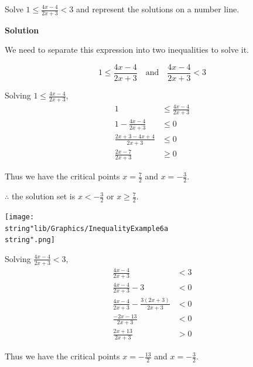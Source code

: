 \documentclass[11pt,a4paper]{book}
\begin{document}
\newpage

\begin{example}

Solve ${\displaystyle 1\leq\frac{4x-4}{2x+3}<3}$ and represent the
solutions on a number line.

\medskip

\textbf{Solution}

We need to separate this expression into two inequalities to solve
it.

\[
1\leq\frac{4x-4}{2x+3}\quad\text{and}\quad\frac{4x-4}{2x+3}<3
\]

Solving ${\displaystyle 1\leq\frac{4x-4}{2x+3}}$,
\begin{align*}
1 & \leq\frac{4x-4}{2x+3}\\
1-\frac{4x-4}{2x+3} & \leq0\\
\frac{2x+3-4x+4}{2x+3} & \leq0\\
\frac{2x-7}{2x+3} & \geq0
\end{align*}

\begin{minipage}[t]{0.6\textwidth} 

Thus we have the critical points ${\displaystyle x=\frac{7}{2}}$
and ${\displaystyle x=-\frac{3}{2}}$.

$\therefore$ the solution set is ${\displaystyle x<-\frac{3}{2}}$
or ${\displaystyle x\geq\frac{7}{2}}$.

\end{minipage}
\begin{minipage}[t]{0.4\textwidth} 
\begin{center}
\texttt{[image: \\string"lib/Graphics/InequalityExample6a\\string".png]}
\par\end{center}

\end{minipage}

Solving ${\displaystyle \frac{4x-4}{2x+3}<3}$,
\begin{align*}
{\displaystyle \frac{4x-4}{2x+3}} & <3\\
{\displaystyle \frac{4x-4}{2x+3}}-3 & <0\\
{\displaystyle \frac{4x-4}{2x+3}}-\frac{3\left(2x+3\right)}{2x+3} & <0\\
\frac{-2x-13}{2x+3} & <0\\
\frac{2x+13}{2x+3} & >0
\end{align*}

\begin{minipage}[t]{0.6\textwidth} 
Thus we have the critical points ${\displaystyle x=-\frac{13}{2}}$
and ${\displaystyle x=-\frac{3}{2}}$.


\end{minipage}
\end{example}
\end{document}
